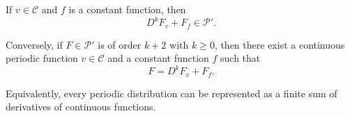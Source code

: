 If $v \in \mathcal{C}$ and $f$ is a constant function, then
$$D^k F_v + F_f \in \mathcal{P}'.$$

Conversely, if $F \in \mathcal{P}'$ is of order $k + 2$ with $k \geq 0$, then there exist a continuous periodic function $v \in \mathcal{C}$ and a constant function $f$ such that
$$F = D^k F_v + F_f.$$

Equivalently, every periodic distribution can be represented as a finite sum of derivatives of continuous functions.
